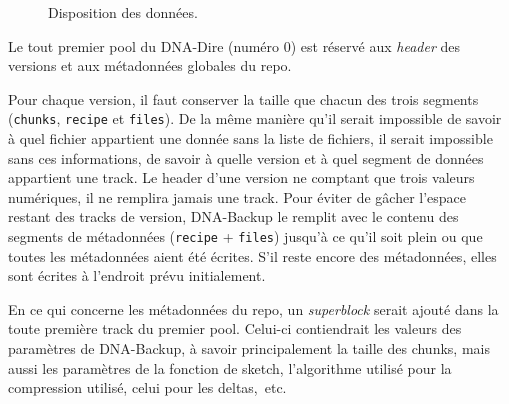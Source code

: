 \documentclass[a4paper]{report}
\begin{document}
\begin{figure}[ht]
\centering


\caption{Disposition des données.}
\label{fig:data-layout}
\end{figure}

Le tout premier pool du DNA-Dire (numéro 0) est réservé aux \emph{header} des versions
et aux métadonnées globales du repo.

Pour chaque version, il faut conserver la taille que chacun des trois segments
(\verb|chunks|, \verb|recipe| et \verb|files|).
De la même manière qu'il serait impossible de savoir
à quel fichier appartient une donnée sans la liste de fichiers,
il serait impossible sans ces informations, de savoir
à quelle version et à quel segment de données appartient une track.
Le header d'une version ne comptant que trois valeurs numériques, il ne remplira jamais une track.
Pour éviter de gâcher l'espace restant des tracks de version,
DNA-Backup le remplit avec le contenu des segments de métadonnées (\verb|recipe| + \verb|files|)
jusqu'à ce qu'il soit plein ou que toutes les métadonnées aient été écrites.
S'il reste encore des métadonnées, elles sont écrites à l'endroit prévu initialement.

En ce qui concerne les métadonnées du repo,
un \emph{superblock} serait ajouté dans la toute première track du premier pool.
Celui-ci contiendrait les valeurs des paramètres de DNA-Backup,
à savoir principalement la taille des chunks, mais aussi les paramètres de la fonction de sketch,
l'algorithme utilisé pour la compression utilisé, celui pour les deltas,~etc.
\end{document}
